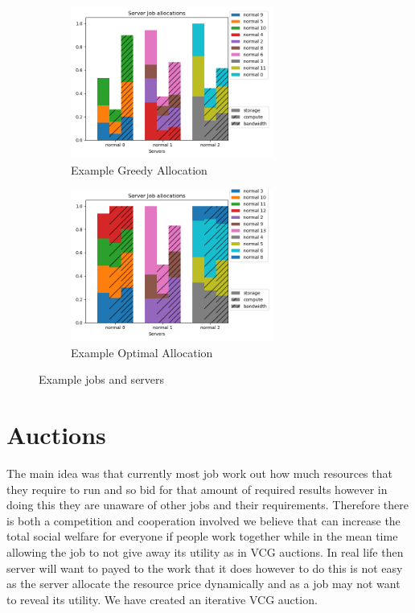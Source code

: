 \documentclass[fleqn]{article}
\begin{document}
\begin{figure}[H]
    \begin{subfigure}{0.5\textwidth}
        \includegraphics[width=1\linewidth, height=5cm]{../results/greedy_allocation.png}
        \caption{Example Greedy Allocation}
    \end{subfigure}
    \begin{subfigure}{0.5\textwidth}
        \includegraphics[width=1\linewidth, height=5cm]{../results/optimal_allocation.png}
        \caption{Example Optimal Allocation}
    \end{subfigure}
    \caption{Example jobs and servers}
\end{figure}

\section{Auctions}\label{sec:auction-idea}
The main idea was that currently most job work out how much resources that they require to run and so bid for that amount of required results however in doing this they are unaware of other jobs and their requirements. Therefore there is both a competition and cooperation involved we believe that can increase the total social welfare for everyone if people work together while in the mean time allowing the job to not give away its utility as in VCG auctions.
In real life then server will want to payed to the work that it does however to do this is not easy as the server allocate the resource price dynamically and as a job may not want to reveal its utility.
We have created an iterative VCG auction.
\end{document}
